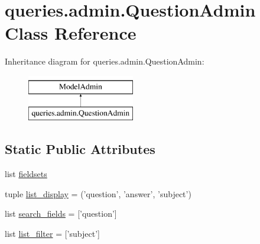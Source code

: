 \hypertarget{classqueries_1_1admin_1_1_question_admin}{\section{queries.\-admin.\-Question\-Admin Class Reference}
\label{classqueries_1_1admin_1_1_question_admin}
}
Inheritance diagram for queries.\-admin.\-Question\-Admin\-:\begin{figure}[H]
\begin{center}
\leavevmode
\includegraphics[height=2.000000cm]{classqueries_1_1admin_1_1_question_admin}
\end{center}
\end{figure}
\subsection*{Static Public Attributes}
\begin{DoxyCompactItemize}
\item 
list \hyperlink{classqueries_1_1admin_1_1_question_admin_a526a0fa069499b9b5c02e47090376629}{fieldsets}
\item 
tuple \hyperlink{classqueries_1_1admin_1_1_question_admin_a42b987bb3e3844a9dcb800b37618ecff}{list\-\_\-display} = ('question', 'answer', 'subject')
\item 
list \hyperlink{classqueries_1_1admin_1_1_question_admin_ac391e9c4221c6acc9ec00c9828f1eee8}{search\-\_\-fields} = \mbox{[}'question'\mbox{]}
\item 
list \hyperlink{classqueries_1_1admin_1_1_question_admin_a435165e182dcf86459386481b5bafcce}{list\-\_\-filter} = \mbox{[}'subject'\mbox{]}
\end{DoxyCompactItemize}


